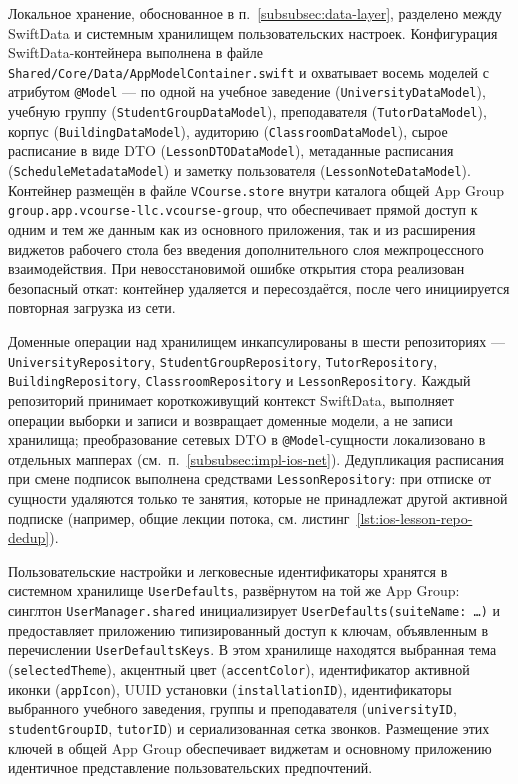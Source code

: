 Локальное хранение, обоснованное в п.~\ref{subsubsec:data-layer}, разделено между SwiftData и системным хранилищем пользовательских настроек. Конфигурация SwiftData-контейнера выполнена в файле \texttt{Shared/\allowbreak Core/\allowbreak Data/\allowbreak AppModelContainer.swift} и охватывает восемь моделей с атрибутом \texttt{@Model} --- по одной на учебное заведение (\texttt{University\allowbreak DataModel}), учебную группу (\texttt{StudentGroup\allowbreak DataModel}), преподавателя (\texttt{Tutor\allowbreak DataModel}), корпус (\texttt{Building\allowbreak DataModel}), аудиторию (\texttt{Classroom\allowbreak DataModel}), сырое расписание в виде DTO (\texttt{LessonDTO\allowbreak DataModel}), метаданные расписания (\texttt{Schedule\allowbreak MetadataModel}) и заметку пользователя (\texttt{LessonNote\allowbreak DataModel}). Контейнер размещён в файле \texttt{VCourse.store} внутри каталога общей App Group \texttt{group.\allowbreak app.\allowbreak vcourse-llc.\allowbreak vcourse-group}, что обеспечивает прямой доступ к одним и тем же данным как из основного приложения, так и из расширения виджетов рабочего стола без введения дополнительного слоя межпроцессного взаимодействия. При невосстановимой ошибке открытия стора реализован безопасный откат: контейнер удаляется и пересоздаётся, после чего инициируется повторная загрузка из сети.

Доменные операции над хранилищем инкапсулированы в шести репозиториях --- \texttt{UniversityRepository}, \texttt{StudentGroupRepository}, \texttt{TutorRepository}, \texttt{BuildingRepository}, \texttt{ClassroomRepository} и \texttt{LessonRepository}. Каждый репозиторий принимает короткоживущий контекст SwiftData, выполняет операции выборки и записи и возвращает доменные модели, а не записи хранилища; преобразование сетевых DTO в \texttt{@Model}-сущности локализовано в отдельных мапперах (см.~п.~\ref{subsubsec:impl-ios-net}). Дедупликация расписания при смене подписок выполнена средствами \texttt{LessonRepository}: при отписке от сущности удаляются только те занятия, которые не принадлежат другой активной подписке (например, общие лекции потока, см. листинг~\ref{lst:ios-lesson-repo-dedup}).

Пользовательские настройки и легковесные идентификаторы хранятся в системном хранилище \texttt{UserDefaults}, развёрнутом на той же App Group: синглтон \texttt{UserManager.shared} инициализирует \texttt{UserDefaults(suiteName: \dots)} и предоставляет приложению типизированный доступ к ключам, объявленным в перечислении \texttt{UserDefaultsKeys}. В этом хранилище находятся выбранная тема (\texttt{selectedTheme}), акцентный цвет (\texttt{accentColor}), идентификатор активной иконки (\texttt{appIcon}), UUID установки (\texttt{installationID}), идентификаторы выбранного учебного заведения, группы и преподавателя (\texttt{universityID}, \texttt{studentGroupID}, \texttt{tutorID}) и сериализованная сетка звонков. Размещение этих ключей в общей App Group обеспечивает виджетам и основному приложению идентичное представление пользовательских предпочтений.

